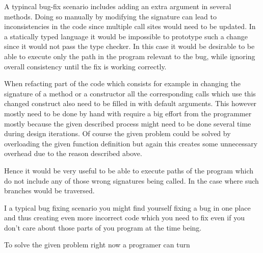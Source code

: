   A typincal bug-fix scenario includes adding an extra argument in several methods. Doing so manually by modifying the signature can lead to inconsistencies in the code since multiple call sites would need to be updated. In a statically typed language it would be impossible to prototype such a change since it would not pass the type checker. In this case it would be desirable to be able to execute only the path in the program relevant to the bug, while ignoring overall consistency until the fix is working correctly.
  
  When refacting part of the code which consists for example in changing the signature of a method or a constructor all the corresponding calls which use this changed construct also need to be filled in with default arguments. This however mostly need to be done by hand with require a big effort from the programmer mostly because the given described process might need to be done several time during design iterations. Of course the given problem could be solved by overloading the given function definition but again this creates some unnecessary overhead due to the reason described above.

  Hence it would be very useful to be able to execute paths of the program which do not include any of those wrong signatures being called. In the case where such branches would be traversed.

  I a typical bug fixing scenario you might find yourself fixing a bug in one place and thus creating even more incorrect code which you need to fix even if you don't care about those parts of you program at the time being.

  To solve the given problem right now a programer can turn


